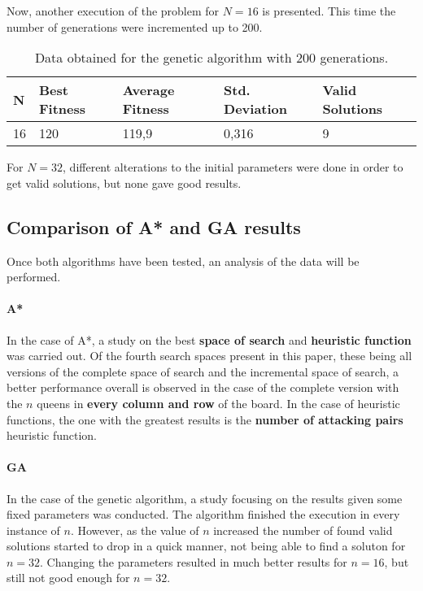 \documentclass[]{llncs}
\begin{document}
Now, another execution of the problem for $N=16$ is presented. This time the number of generations were incremented up to 200.

\begin{table}[H]
    \caption{Data obtained for the genetic algorithm with 200 generations.}
    \centering
    \begin{tabular}{|l|l|l|l|l|}
        \hline
        N  & Best Fitness & Average Fitness & Std. Deviation & Valid Solutions      \\ \hline
        16 & 120          & 119,9           & 0,316          & 9                    \\ \hline
    \end{tabular}
    \label{tab:ag-data-2}
\end{table}

For $N=32$, different alterations to the initial parameters were done in order to get valid solutions, but none gave good results.
\subsection{Comparison of A* and GA results}\label{comparison_astar_gen}
Once both algorithms have been tested, an analysis of the data will be performed.

\paragraph{A*} 
In the case of A*, a study on the best \textbf{space of search} and \textbf{heuristic function} was carried out. Of the fourth search spaces present in this paper, these being all versions of the complete space of search and the incremental space of search, a better performance overall is observed in the case of the complete version with the $n$ queens in \textbf{every column and row} of the board. In the case of heuristic functions, the one with the greatest results is the \textbf{number of attacking pairs} heuristic function.

\paragraph{GA}
In the case of the genetic algorithm, a study focusing on the results given some fixed parameters was conducted. The algorithm finished the execution in every instance of $n$. However, as the value of $n$ increased the number of found valid solutions started to drop in a quick manner, not being able to find a soluton for $n = 32$. Changing the parameters resulted in much better results for $n = 16$, but still not good enough for $n = 32$.  
\end{document}
